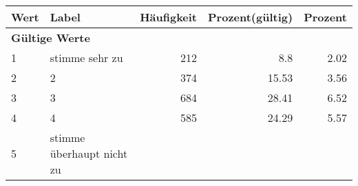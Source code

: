      \begin{longtable}{lXrrr}
     \toprule
     \textbf{Wert} & \textbf{Label} & \textbf{Häufigkeit} & \textbf{Prozent(gültig)} & \textbf{Prozent} \\
     \endhead
     \midrule
     \multicolumn{5}{l}{\textbf{Gültige Werte}}\\

     1 &
     \multicolumn{1}{X}{ stimme sehr zu   } &


       \num{212} &
       \num[round-mode=places,round-precision=2]{8.8} &
         \num[round-mode=places,round-precision=2]{2.02} \\

     2 &
     \multicolumn{1}{X}{ 2   } &


       \num{374} &
       \num[round-mode=places,round-precision=2]{15.53} &
         \num[round-mode=places,round-precision=2]{3.56} \\

     3 &
     \multicolumn{1}{X}{ 3   } &


       \num{684} &
       \num[round-mode=places,round-precision=2]{28.41} &
         \num[round-mode=places,round-precision=2]{6.52} \\

     4 &
     \multicolumn{1}{X}{ 4   } &


       \num{585} &
       \num[round-mode=places,round-precision=2]{24.29} &
         \num[round-mode=places,round-precision=2]{5.57} \\

     5 &
     \multicolumn{1}{X}{ stimme überhaupt nicht zu   } &



\end{longtable}
